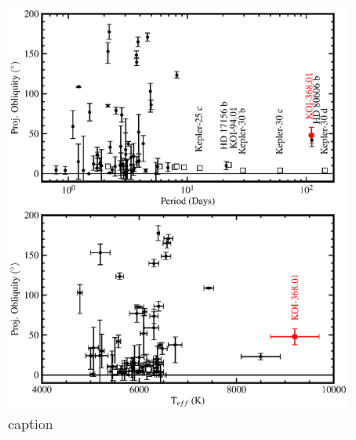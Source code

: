 \documentclass[preprint]{emulateapj}
\begin{document}
\begin{figure}[h]
  \centering
  \includegraphics[width=9cm]{period_obliq.eps}
  \caption{caption}
  \label{fig:periodobliq}
\end{figure}



\end{document}
